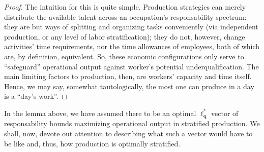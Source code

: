 \documentclass[hidelinks, nonatbib]{elsarticle}
\begin{document}
\begin{lemma}
\begin{proof}
        The intuition for this is quite simple. Production strategies can merely distribute the available talent across an occupation's responsability spectrum: they are but ways of splitting and organizing tasks conveniently (via independent production, or any level of labor stratification); they do not, however, change activities' time requirements, nor the time allowances of employees, both of which are, by definition, equivalent. So, these economic configurations only serve to ``safeguard'' operational output against worker's potential underqualification. The main limiting factors to production, then, are workers' capacity and time itself. Hence, we may say, somewhat tautologically, the most one can produce in a day is a ``day's work''.
    \end{proof}
\end{lemma}

In the lemma above, we have assumed there to be an optimal $\boldsymbol{\ell_{q}^{*}}$ vector of responsability bounds maximizing operational output in stratified production. We shall, now, devote out attention to describing what such a vector would have to be like and, thus, how production is optimally stratified.
\end{document}
